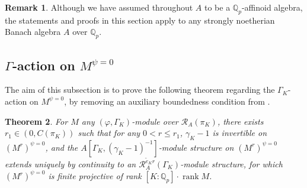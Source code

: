 \documentclass[12pt]{article}
\newtheorem{theorem}{Theorem}[subsection]
\theoremstyle{definition}
\newtheorem{remark}[theorem]{Remark}
\numberwithin{equation}{theorem}
\newcommand{\calR}{\mathcal{R}}
\newcommand{\QQ}{\mathbb{Q}}
\def\Qp{\QQ_p}
\DeclareMathOperator{\rank}{rank}
\begin{document}
\begin{remark}
Although we have assumed throughout $A$ to be a $\Qp$-affinoid
algebra, the statements and proofs in this section apply to any
strongly noetherian Banach algebra $A$ over $\Qp$.
\end{remark}


\subsection{$\Gamma$-action on $M^{\psi=0}$}



The aim of this subsection is to prove the following theorem regarding the $\Gamma_K$-action on $M^{\psi=0}$, by removing an auxiliary boundedness condition from \cite[Th\'eor\`eme~2.4]{chenevier}.

\begin{theorem}
\label{T:structure of D^psi=0}
For $M$ any $(\varphi,\Gamma_K)$-module over $\calR_A(\pi_K)$, there
exists $r_1 \in (0,C(\pi_K))$ such that for any $0< r \leq r_1$,
$\gamma_K - 1$ is invertible on $(M^r)^{\psi=0}$, and the $A[\Gamma_K,
  (\gamma_K-1)^{-1}]$-module structure on $(M^r)^{\psi=0}$ extends
uniquely by continuity to an $\calR_A^{\tilde e_K r}(\Gamma_K)$-module
structure, for which $(M^r)^{\psi=0}$ is finite projective of rank
$[K:\Qp]\cdot\rank M$.
\end{theorem}
\end{document}
